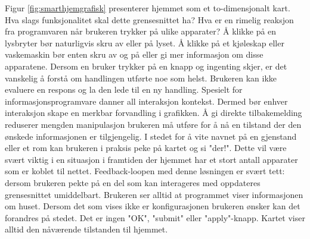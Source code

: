 Figur \ref{fig:smarthjemgrafisk} presenterer hjemmet som et to-dimensjonalt kart. Hva slags funksjonalitet skal dette grensesnittet ha? Hva er en rimelig reaksjon fra programvaren når brukeren trykker på ulike apparater? Å klikke på en lysbryter bør naturligvis skru av eller på lyset. Å klikke på et kjøleskap eller vaskemaskin bør enten skru av og på eller gi mer informasjon om disse apparatene. Dersom en bruker trykker på en knapp og ingenting skjer, er det vanskelig å forstå om handlingen utførte noe som helst. Brukeren kan ikke evaluere en respons og la den lede til en ny handling. Spesielt for informasjonsprogramvare danner all interaksjon kontekst. Dermed bør enhver interaksjon skape en merkbar forvandling i grafikken. Å gi direkte tilbakemelding reduserer mengden manipulasjon brukeren må utføre for å nå en tilstand der den ønskede informasjonen er tilgjengelig. I stedet for å vite navnet på en gjenstand eller et rom kan brukeren i praksis peke på kartet og si "der!". Dette vil være svært viktig i en situasjon i framtiden der hjemmet har et stort antall apparater som er koblet til nettet. Feedback-loopen med denne løsningen er svært tett: dersom brukeren pekte på en del som kan interageres med oppdateres grensesnittet umiddelbart. Brukeren ser alltid at programmet viser informasjonen om huset. Dersom det som vises ikke er konfigurasjonen brukeren ønsker kan det forandres på stedet. Det er ingen "OK", "submit" eller "apply"-knapp. Kartet viser alltid den nåværende tilstanden til hjemmet.
